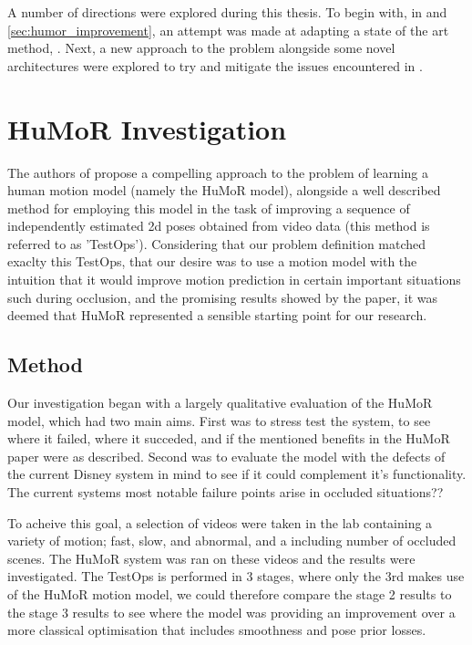 
A number of directions were explored during this thesis. To begin with, in  and \ref{sec:humor_improvement}, an attempt was made at adapting a state of the art method, \cite{humor}. Next, a new approach to the problem alongside some novel architectures were explored to try and mitigate the issues encountered in .

\section{HuMoR Investigation}
\label{sec:humor_investigation}


The authors of \cite{humor} propose a compelling approach to the problem of learning a human motion model (namely the HuMoR model), alongside a well described method for employing this model in the task of improving a sequence of independently estimated 2d poses obtained from video data (this method is referred to as 'TestOps').  Considering that our problem definition matched exaclty this TestOps, that our desire was to use a motion model with the intuition that it would improve motion prediction in certain important situations such during occlusion, and the promising results showed by the paper, it was deemed that HuMoR represented a sensible starting point for our research.



\subsection{Method}
Our investigation began with a largely qualitative evaluation of the HuMoR model, which had two main aims.  First was to stress test the system, to see where it failed, where it succeded, and if the mentioned benefits in the HuMoR paper \cite{humor} were as described.  Second was to evaluate the model with the defects of the current Disney system in mind to see if it could complement it's functionality.
The current systems most notable failure points arise in occluded situations?? 

To acheive this goal, a selection of videos were taken in the lab containing a variety of motion; fast, slow, and abnormal, and a including number of occluded scenes.  The HuMoR system was ran on these videos and the results were investigated.  The TestOps is performed in 3 stages, where only the 3rd makes use of the HuMoR motion model, we could therefore compare the stage 2 results to the stage 3 results to see where the model was providing an improvement over a more classical optimisation that includes smoothness and pose prior losses.


